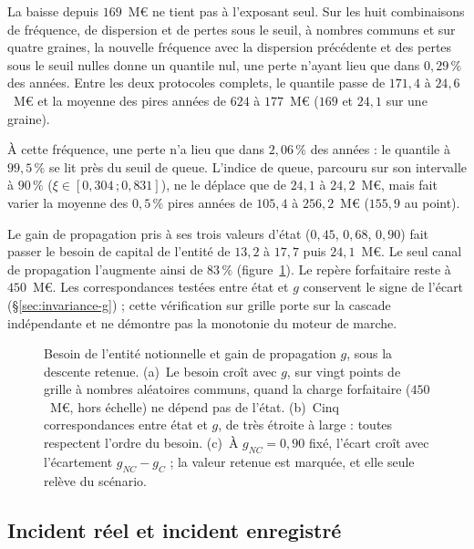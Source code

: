 La baisse depuis $169$~M\euro{} ne tient pas à l'exposant seul. Sur les huit combinaisons de fréquence,
de dispersion et de pertes sous le seuil, à nombres communs et sur quatre graines, la nouvelle fréquence
avec la dispersion précédente et des pertes sous le seuil nulles donne un quantile nul, une perte n'ayant
lieu que dans $0{,}29\,\%$ des années. Entre les deux protocoles complets, le quantile passe de $171{,}4$ à $24{,}6$~M\euro{} et la
moyenne des pires années de $624$ à $177$~M\euro{} ($169$ et $24{,}1$ sur une graine).

À cette fréquence, une perte n'a lieu que dans $2{,}06\,\%$ des années : le quantile à $99{,}5\,\%$ se lit
près du seuil de queue. L'indice de queue, parcouru sur son intervalle à $90\,\%$
($\xi \in [0{,}304\,;0{,}831]$), ne le déplace que de $24{,}1$ à $24{,}2$~M\euro, mais fait varier la
moyenne des $0{,}5\,\%$ pires années de $105{,}4$ à $256{,}2$~M\euro{} ($155{,}9$ au point).

Le gain de propagation pris à ses trois valeurs d'état ($0{,}45$, $0{,}68$, $0{,}90$) fait passer le
besoin de capital de l'entité de $13{,}2$ à $17{,}7$ puis $24{,}1$~M\euro. Le seul canal de propagation
l'augmente ainsi de $83\,\%$ (figure~\ref{fig:invariance-g-rapport}). Le repère forfaitaire reste à $450$~M\euro. Les correspondances testées entre état et $g$ conservent le signe de l'écart (\S\ref{sec:invariance-g}) ; cette vérification sur grille porte sur la cascade indépendante et ne démontre pas la monotonie du moteur de marche.

\begin{figure}[H]\centering
{}
\caption{Besoin de l'entité notionnelle et gain de propagation $g$, sous la descente retenue.
(a)~Le besoin croît avec $g$, sur vingt points de grille à nombres aléatoires communs, quand la
charge forfaitaire ($450$~M\euro, hors échelle) ne dépend pas de l'état. (b)~Cinq correspondances
entre état et $g$, de très étroite à large : toutes respectent l'ordre du besoin. (c)~À
$g_{NC}=0{,}90$ fixé, l'écart croît avec l'écartement $g_{NC}-g_C$ ; la valeur retenue est marquée,
et elle seule relève du scénario.}
\label{fig:invariance-g-rapport}
\end{figure}

\subsection{Incident réel et incident enregistré}
\label{sec:descente-observation}

